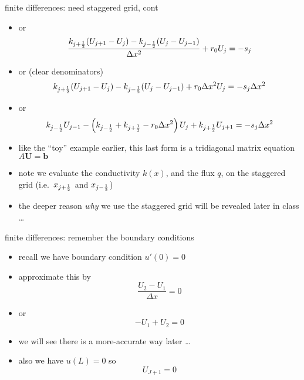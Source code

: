 \documentclass[10pt,hyperref]{beamer}
\newcommand{\bb}{\mathbf{b}}
\newcommand{\bU}{\mathbf{U}}
\begin{document}
\begin{frame}{finite differences: need staggered grid, cont} 

\begin{itemize}
\item or
	$$\frac{k_{j+\frac{1}{2}} (U_{j+1} - U_j) - k_{j-\frac{1}{2}} (U_{j} - U_{j-1})}{\Delta x^2} + r_0 U_j = - s_j$$
\item or (clear denominators)
	$$k_{j+\frac{1}{2}} (U_{j+1} - U_j) - k_{j-\frac{1}{2}} (U_{j} - U_{j-1}) + r_0 \Delta x^2 U_j = - s_j \Delta x^2$$
\item or
	$$k_{j-\frac{1}{2}} U_{j-1} - \left(k_{j-\frac{1}{2}}+k_{j+\frac{1}{2}} - r_0 \Delta x^2\right) U_j + k_{j+\frac{1}{2}} U_{j+1} = - s_j \Delta x^2$$
\item like the ``toy'' example earlier, this last form is a tridiagonal matrix equation $A\bU = \bb$
\item note we evaluate the conductivity $k(x)$, and the flux $q$, on the staggered grid (i.e.~$x_{j+\frac{1}{2}}$ and $x_{j-\frac{1}{2}}$)
\item the deeper reason \emph{why} we use the staggered grid will be revealed later in class \dots
\end{itemize}
\end{frame}


\begin{frame}{finite differences: remember the boundary conditions} 

\begin{itemize}
\item recall we have boundary condition $u'(0)=0$
\item approximate this by 
	$$\frac{U_2 - U_1}{\Delta x} = 0$$
\item or 
	$$- U_1 + U_2 = 0$$
\item we will see there is a more-accurate way later \dots
\item also we have $u(L) = 0$ so
	$$U_{J+1} = 0$$
\end{itemize}
\end{frame}
\end{document}
